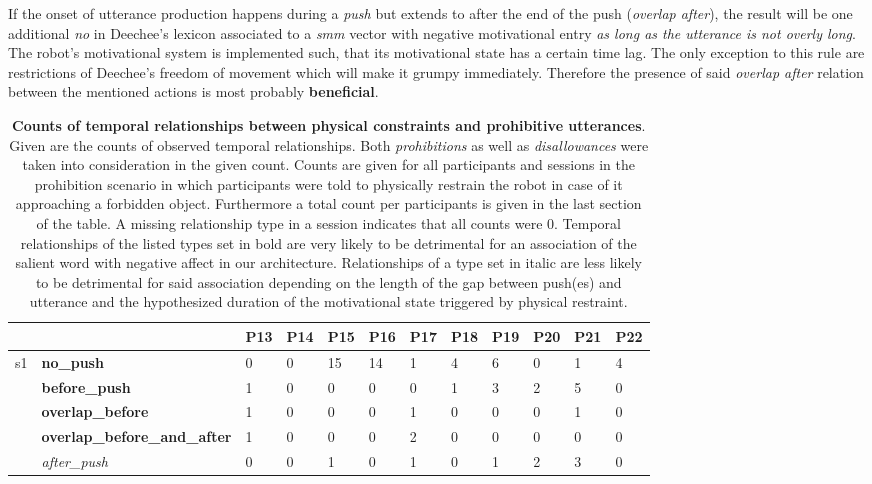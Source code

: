 If the onset of utterance production happens during a \emph{push} but extends to after the end of the push (\emph{overlap after}), the result will be one
additional \emph{no} in Deechee's lexicon associated to a \emph{smm} vector with negative motivational entry \emph{as long as the utterance is not overly long}.
The robot's motivational system is implemented such, that its motivational state has a certain time lag. The only exception to this rule are restrictions of
Deechee's freedom of movement which will make it grumpy immediately. Therefore the presence of said \emph{overlap after} relation between the mentioned actions
is most probably \textbf{beneficial}.
\begin{table*}[h]
\caption{\textbf{Counts of temporal relationships between physical constraints and prohibitive utterances}. Given are the counts of observed
    temporal relationships. Both \emph{prohibitions} as well as \emph{disallowances} were taken into consideration in the given count. Counts 
    are given for all participants and sessions in the prohibition scenario in which participants were told to physically restrain the robot 
    in case of it approaching a forbidden object. Furthermore a total count per participants is given in the last section of the table. A missing
    relationship type in a session indicates that all counts were 0. Temporal relationships of the listed types set in bold are very likely to be
    detrimental for an association of the salient word with negative affect in our architecture. Relationships of a type set in italic are less likely to be
    detrimental for said association depending on the length of the gap between push(es) and utterance and the hypothesized duration of the 
    motivational state triggered by physical restraint.}
  \label{tbl:prohibition_rel}
\begin{tabular*}{\hsize}{@{\extracolsep{\fill}}llllllllllll}
    \toprule
    &  & P13 & P14 & P15 & P16 & P17 & P18 & P19 & P20 & P21 & P22\\
    \midrule
    \multirow{8}{*}{s1} & \textbf{no\_push} & 0 & 0 & 15 & 14 & 1 & 4 & 6 & 0 & 1 & 4\\
    & \textbf{before\_push} & 1 & 0 & 0 & 0 & 0 & 1 & 3 & 2 & 5 & 0\\
    & \textbf{overlap\_before} & 1 & 0 & 0 & 0 & 1 & 0 & 0 & 0 & 1 & 0\\
    & \textbf{overlap\_before\_and\_after} & 1 & 0 & 0 & 0 & 2 & 0 & 0 & 0 & 0 & 0\\
    & \textsl{after\_push} & 0 & 0 & 1 & 0 & 1 & 0 & 1 & 2 & 3 & 0\\

\end{tabular*}
\end{table*}
